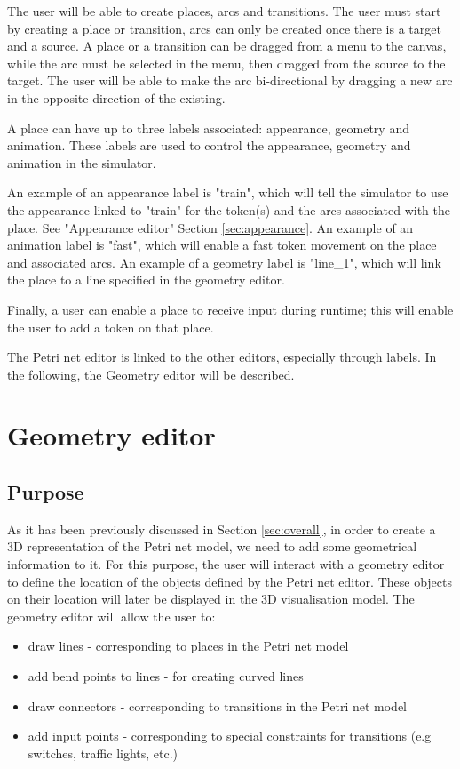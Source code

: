 The user will be able to create places, arcs and transitions. The user must start by creating a place or transition, arcs can only be created once there is a target and a source. A place or a transition can be dragged from a menu to the canvas, while the arc must be selected in the menu, then dragged from the source to the target. The user will be able to make the arc bi-directional by dragging a new arc in the opposite direction of the existing. 

A place can have up to three labels associated: appearance, geometry and animation. These labels are used to control the appearance, geometry and animation in the simulator. 

An example of an appearance label is "train", which will tell the simulator to use the appearance linked to "train" for the token(s) and the arcs associated with the place. See "Appearance editor" Section \ref{sec:appearance}. An example of an animation label is "fast", which will enable a fast token movement on the place and associated arcs. An example of a geometry label is "line\_1", which will link the place to a line specified in the geometry editor. 

Finally, a user can enable a place to receive input during runtime; this will enable the user to add a token on that place.

The Petri net editor is linked to the other editors, especially through labels. In the following, the Geometry editor will be described. 

\section{Geometry editor}


\subsection{Purpose}
As it has been previously discussed in Section \ref{sec:overall}, in order to create a 3D representation of the Petri net model, we need to add some geometrical information to it.  For this purpose, the user will interact with a geometry editor to define the location of the objects defined by the Petri net editor. These objects on their location will later be displayed in the 3D visualisation model. 
The geometry editor will allow the user to:
\begin{itemize}
\item draw lines - corresponding to places in the Petri net model
\item add bend points to lines - for creating curved lines
\item draw connectors - corresponding to transitions in the Petri net model
\item add input points  - corresponding to special constraints for transitions (e.g switches, traffic lights, etc.)
\end{itemize}

